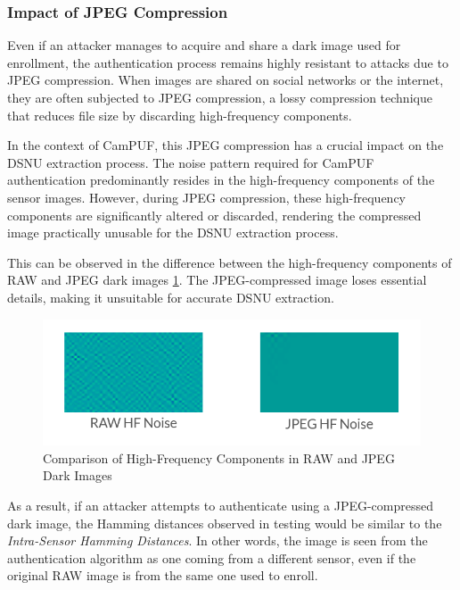 \subsubsection{Impact of JPEG Compression}

Even if an attacker manages to acquire and share a dark image used for enrollment, the authentication process remains highly resistant to attacks due to JPEG compression. When images are shared on social networks or the internet, they are often subjected to JPEG compression, a lossy compression technique that reduces file size by discarding high-frequency components.

In the context of CamPUF, this JPEG compression has a crucial impact on the DSNU extraction process. The noise pattern required for CamPUF authentication predominantly resides in the high-frequency components of the sensor images. However, during JPEG compression, these high-frequency components are significantly altered or discarded, rendering the compressed image practically unusable for the DSNU extraction process.

This can be observed in the difference between the high-frequency components of RAW and JPEG dark images \ref{fig:jpeg_comp}. The JPEG-compressed image loses essential details, making it unsuitable for accurate DSNU extraction.

\begin{figure}[h!]
	\centering
	\vspace{0.5cm}
	\includegraphics{images/jpeg_vs_raw_HF.png}
	\caption{Comparison of High-Frequency Components in RAW and JPEG Dark Images}
	\label{fig:jpeg_comp}
\end{figure}

As a result, if an attacker attempts to authenticate using a JPEG-compressed dark image, the Hamming distances observed in testing would be similar to the \emph{Intra-Sensor Hamming Distances}. In other words, the image is seen from the authentication algorithm as one coming from a different sensor, even if the original RAW image is from the same one used to enroll.

